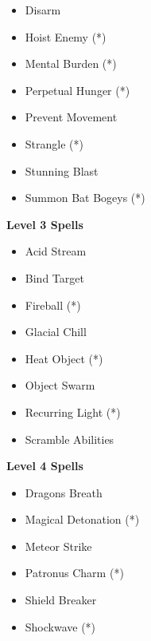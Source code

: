 \begin{multicols}{4}
{\begin{itemize}[itemsep=0em]
\item Disarm

\item Hoist Enemy (*) 

\item Mental Burden (*) 

\item Perpetual Hunger (*) 

\item Prevent Movement

\item Strangle (*) 

\item Stunning Blast

\item Summon Bat Bogeys (*) 


\end{itemize}
\textbf{Level 3 Spells}
\begin{itemize}[itemsep=0em]
\renewcommand\labelitemi{-}
\item Acid Stream

\item Bind Target

\item Fireball (*) 

\item Glacial Chill

\item Heat Object (*) 

\item Object Swarm

\item Recurring Light (*) 

\item Scramble Abilities


\end{itemize}
\textbf{Level 4 Spells}
\begin{itemize}[itemsep=0em]
\renewcommand\labelitemi{-}
\item Dragon{\apos}s Breath

\item Magical Detonation (*) 

\item Meteor Strike

\item Patronus Charm (*) 

\item Shield Breaker

\item Shockwave (*) 



\end{itemize}}
\end{multicols}
